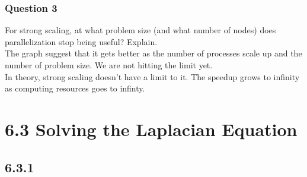 \documentclass[]{article}
\begin{document}
        \subsubsection*{Question 3}
            For strong scaling, at what problem size (and what number of nodes) does parallelization stop being useful? Explain.
            \\[1.1em]
            The graph suggest that it gets better as the number of processes scale up and the number of problem size. We are not hitting the limit yet. 
            \\
            In theory, strong scaling doesn't have a limit to it. The speedup grows to infinity as computing resources goes to infinty. 

    \section*{6.3 Solving the Laplacian Equation}
        \subsection*{6.3.1}
\end{document}
